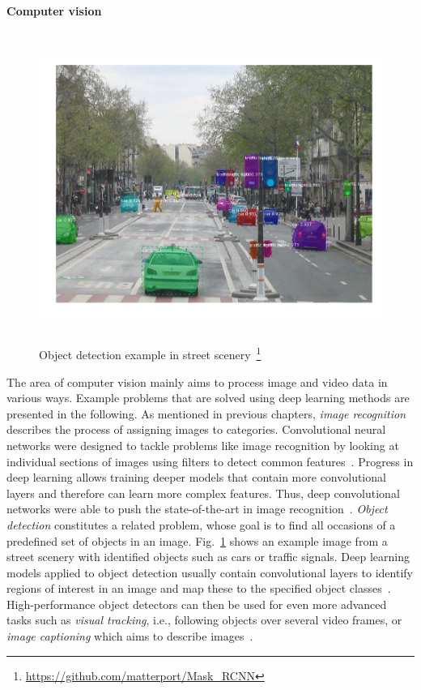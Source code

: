 \paragraph{Computer vision}
\label{sub:dl_app_cv}

\begin{figure}[h]
  \centering
  \includegraphics[height=10cm]{img/mask_rcnn}
  \caption[Object detection example]{Object detection example in street scenery~\footnote{\url{https://github.com/matterport/Mask_RCNN}}}
\label{fig:obj_detection}
\end{figure}

The area of computer vision mainly aims to process image and video data in
various ways.
Example problems that are solved using deep learning methods are presented in
the following.
As mentioned in previous chapters, \textit{image recognition} describes the
process of assigning images to categories.
Convolutional neural networks were designed to tackle problems like image
recognition by looking at individual sections of images using filters to
detect common features~\cite{LeCun1998}.
Progress in deep learning allows training deeper models that contain more
convolutional layers and therefore can learn more complex features.
Thus, deep convolutional networks were able to push the state-of-the-art in image recognition~\cite{Krizhevsky2012, He2016}.
\textit{Object detection} constitutes a related problem, whose goal is
to find all occasions of a predefined set of objects in an image.
Fig.~\ref{fig:obj_detection} shows an example image from a street scenery
with identified objects such as cars or traffic signals.
Deep learning models applied to object detection usually contain convolutional
layers to identify regions of interest in an image and map these to the
specified object classes~\cite{Girshick2012, He2017}.
High-performance object detectors can then be used for even more advanced
tasks such as \textit{visual tracking}, i.e., following objects over several video
frames, or \textit{image captioning} which aims to describe images~\cite{Bertinetto2016, Karpathy2017}.

